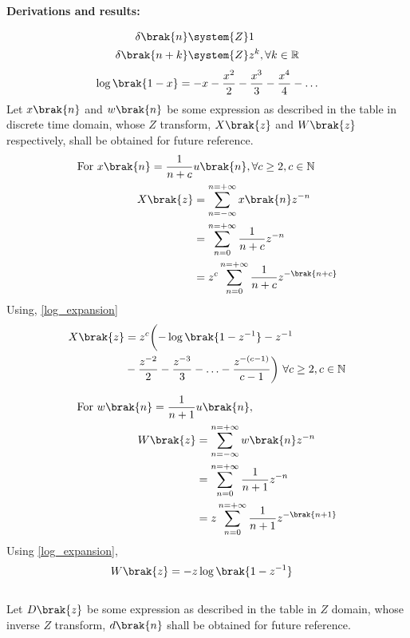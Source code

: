\textbf{Derivations and results:} \\
\begin{table}[ht]

\end{table}
\begin{align}
	\delta\brak{n} &\system{Z} 1 \\
	\delta\brak{n+k} &\system{Z}z^{k} ,\forall k\in \mathbb{R} \label{delta_func}
\end{align}
\begin{align}
        \log\brak{1-x} = -x - \frac{x^2}{2} - \frac{x^3}{3}-\frac{x^4}{4}- \ldots \label{log_expansion}
\end{align}
Let $x\brak{n}$ and $w\brak{n}$ be some expression as described in the table in discrete time domain, whose $Z$ transform, $X\brak{z}$ and $W\brak{z}$ respectively, shall be obtained for future reference.\\
\begin{align}
    \notag \text{For }  x\brak{n} = \frac{1}{n+c} &u\brak{n},\forall c \geq 2,c \in \mathbb{N}\\
    X\brak{z} &= \sum_{n= -\infty}^{n= +\infty} x\brak{n}z^{-n}\\
    &=\sum_{n = 0}^{n = +\infty} \frac{1}{n+c}z^{-n}\\
    &= z^c\sum_{n = 0}^{n = +\infty} \frac{1}{n+c}z^{-\brak{n+c}}
\end{align}
Using, \eqref{log_expansion}
\begin{align}
    X\brak{z}&= z^c \biggl(-\log\brak{1-z^{-1}}- z^{-1}\notag\\& -\frac{z^{-2}}{2}-\frac{z^{-3}}{3} - \ldots -\frac{z^{-(c-1)}}{c-1} \biggr)\ \forall c \geq 2, c \in \mathbb{N} \label{when_c_not_1}
\end{align} 

\begin{align}
	\notag \text{For } w\brak{n} = \frac{1}{n+1}&u\brak{n},\\
	W\brak{z} &=\sum_{n= -\infty}^{n= +\infty} w\brak{n}z^{-n}\\
	&= \sum_{n = 0}^{n = +\infty} \frac{1}{n+1}z^{-n}\\
	&= z\sum_{n = 0}^{n = +\infty} \frac{1}{n+1}z^{-\brak{n+1}} 
\end{align}
Using \eqref{log_expansion},
\begin{align}
	W\brak{z}&= -z\log\brak{1-z^{-1}} \label{when_c_equals_1}	
\end{align}
\\
Let $D\brak{z}$ be some expression as described in the table in $Z$ domain, whose inverse $Z$ transform, $d\brak{n}$ shall be obtained for future reference.\\

